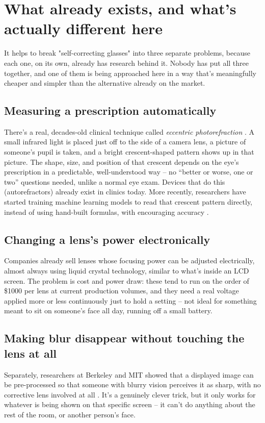 \documentclass[11pt]{article}
\begin{document}
\section{What already exists, and what's actually different here}
\label{sec:existing}

It helps to break "self-correcting glasses" into three separate problems, because each one, on its own, already has research behind it. Nobody has put all three together, and one of them is being approached here in a way that's meaningfully cheaper and simpler than the alternative already on the market.

\subsection{Measuring a prescription automatically}
There's a real, decades-old clinical technique called \emph{eccentric photorefraction} \cite{schaeffel1993, choi2000}. A small infrared light is placed just off to the side of a camera lens, a picture of someone's pupil is taken, and a bright crescent-shaped pattern shows up in that picture. The shape, size, and position of that crescent depends on the eye's prescription in a predictable, well-understood way -- no ``better or worse, one or two'' questions needed, unlike a normal eye exam. Devices that do this (autorefractors) already exist in clinics today. More recently, researchers have started training machine learning models to read that crescent pattern directly, instead of using hand-built formulas, with encouraging accuracy \cite{kim2025}.

\subsection{Changing a lens's power electronically}
Companies already sell lenses whose focusing power can be adjusted electrically, almost always using liquid crystal technology, similar to what's inside an LCD screen. The problem is cost and power draw: these tend to run on the order of \$1000 per lens at current production volumes, and they need a real voltage applied more or less continuously just to hold a setting -- not ideal for something meant to sit on someone's face all day, running off a small battery.

\subsection{Making blur disappear without touching the lens at all}
Separately, researchers at Berkeley and MIT showed that a displayed image can be pre-processed so that someone with blurry vision perceives it as sharp, with no corrective lens involved at all \cite{huang2014, pamplona2010}. It's a genuinely clever trick, but it only works for whatever is being shown on that specific screen -- it can't do anything about the rest of the room, or another person's face.
\end{document}
